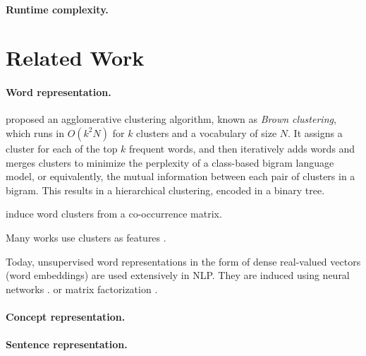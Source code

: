 \documentclass{article}
\begin{document}
\paragraph{Runtime complexity.}


\section{Related Work}\label{sec:related_work}

\paragraph{Word representation.}
\citet{brown1992class} proposed an agglomerative clustering algorithm,
known as \textit{Brown clustering},
which runs in $O(k^2N)$ for $k$ clusters and a vocabulary of size $N$.
It assigns a cluster for each of the top $k$ frequent words,
and then iteratively adds words and merges clusters to minimize the
perplexity of a class-based bigram language model,
or equivalently, the mutual information between each pair of clusters in a bigram.
This results in a hierarchical clustering, encoded in a binary tree.

\citet{pereira1993distributional} induce word clusters from a co-occurrence matrix.

Many works use clusters as features \cite{miller2004name,koo2008simple,huang2009distributional,zhao2009multilingual}.

Today, unsupervised word representations in the form of dense real-valued vectors
(word embeddings) are used extensively in NLP.
They are induced using neural networks 
\cite{bengio2003neural,mnih2007three,collobert2008unified,turian2010word,mikolov2013efficient}.
or matrix factorization \cite{pennington2014glove}.

\paragraph{Concept representation.}


\paragraph{Sentence representation.}




\end{document}
